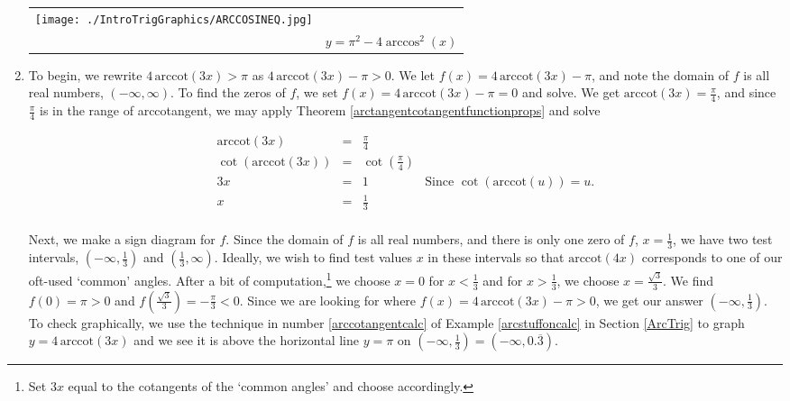 \begin{ex}
\begin{enumerate}
\begin{center}
\begin{tabular}{m{2in}c}
\hspace{.75in} \texttt{[image: ./IntroTrigGraphics/ARCCOSINEQ.jpg]} \\

& \hspace{.75in} $y = \pi^2-4\arccos^{2}(x)$  \\

\end{tabular}

\end{center}



\item   To begin, we rewrite $4 \, \text{arccot}(3x) > \pi$ as $4 \, \text{arccot}(3x) -  \pi > 0$.  We let $f(x) = 4 \, \text{arccot}(3x) -  \pi$, and note the domain of $f$ is all real numbers, $(-\infty, \infty)$.  To find the zeros of $f$, we set $f(x) = 4 \, \text{arccot}(3x) -  \pi = 0$ and solve.  We get $\text{arccot}(3x) = \frac{\pi}{4}$, and since $\frac{\pi}{4}$ is in the range of arccotangent, we may apply Theorem \ref{arctangentcotangentfunctionprops} and solve 

\[ \begin{array}{rclr}

\text{arccot}(3x) & = & \frac{\pi}{4} & \\ [5pt]
\cot(\text{arccot}(3x)) & = & \cot\left(\frac{\pi}{4}\right) & \\ [5pt]
3x & = & 1 & \text{Since $\cot(\text{arccot}(u)) = u$.} \\ [5pt]
x & = & \frac{1}{3} &  \\ \end{array}\]


Next, we make a sign diagram for $f$.  Since the domain of $f$ is all real numbers, and there is only one zero of $f$, $x = \frac{1}{3}$, we have two test intervals, $\left(-\infty, \frac{1}{3}\right)$ and  $\left(\frac{1}{3}, \infty \right)$. Ideally, we wish to find test values $x$ in these intervals so that $\text{arccot}(4x)$ corresponds to one of our oft-used `common' angles.  After a bit of computation,\footnote{Set $3x$ equal to the cotangents of the `common angles' and choose accordingly.} we choose $x=0$ for $x < \frac{1}{3}$ and for $x > \frac{1}{3}$, we choose $x = \frac{\sqrt{3}}{3}$.  We find $f(0) = \pi > 0$ and $f\left(\frac{\sqrt{3}}{3}\right) = -\frac{\pi}{3} < 0$.  Since we are looking for where $f(x) = 4 \, \text{arccot}(3x) -  \pi > 0$, we get our answer $\left(-\infty, \frac{1}{3}\right)$.  To check graphically, we use the technique in number \ref{arccotangentcalc} of Example \ref{arcstuffoncalc} in Section \ref{ArcTrig} to graph $y = 4 \, \text{arccot}(3x)$  and we see it is above the horizontal line $y = \pi$ on $\left(-\infty, \frac{1}{3}\right) = \left(-\infty, 0.\overline{3}\right)$.




\end{enumerate}
\end{ex}
